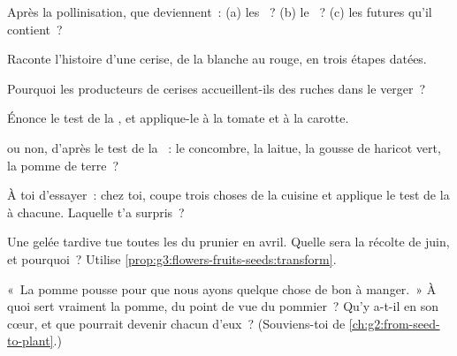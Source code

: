 \begin{exercise}[$\star$]\label{exo:g3:flowers-fruits-seeds:3}
Après la pollinisation, que deviennent~: (a) les ~? (b) le
~? (c) les futures  qu'il contient~?
\end{exercise}

\begin{exercise}[$\star$]\label{exo:g3:flowers-fruits-seeds:4}
Raconte l'histoire d'une cerise, de la  blanche au  rouge,
en trois étapes datées.
\end{exercise}

\begin{exercise}[$\star$]\label{exo:g3:flowers-fruits-seeds:5}
Pourquoi les producteurs de cerises accueillent-ils des ruches dans
le verger~?
\end{exercise}

\begin{exercise}[$\star$]\label{exo:g3:flowers-fruits-seeds:6}
Énonce le test de la , et applique-le à la tomate et à la
carotte.
\end{exercise}

\begin{exercise}[$\star$]\label{exo:g3:flowers-fruits-seeds:7}
 ou non, d'après le test de la ~: le concombre, la
laitue, la gousse de haricot vert, la pomme de terre~?
\end{exercise}

\begin{exercise}[$\star$]\label{exo:g3:flowers-fruits-seeds:8}
À toi d'essayer~: chez toi, coupe trois choses de la cuisine et
applique le test de la  à chacune. Laquelle t'a surpris~?
\end{exercise}

\begin{exercise}[$\star\star$]\label{exo:g3:flowers-fruits-seeds:9}
Une gelée tardive tue toutes les  du prunier en avril. Quelle
sera la récolte de juin, et pourquoi~? Utilise
\cref{prop:g3:flowers-fruits-seeds:transform}.
\end{exercise}

\begin{exercise}[$\star\star$]\label{exo:g3:flowers-fruits-seeds:10}
«~La pomme pousse pour que nous ayons quelque chose de bon à
manger.~» À quoi sert vraiment la pomme, du point de vue du
pommier~? Qu'y a-t-il en son cœur, et que pourrait devenir chacun
d'eux~? (Souviens-toi de \cref{ch:g2:from-seed-to-plant}.)
\end{exercise}
